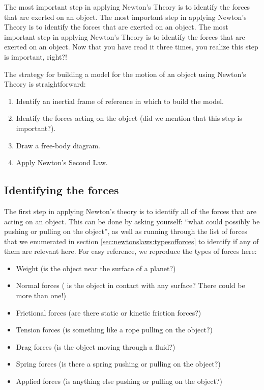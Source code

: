 The most important step in applying Newton's Theory is to identify the forces that are exerted on an object. The most important step in applying Newton's Theory is to identify the forces that are exerted on an object. The most important step in applying Newton's Theory is to identify the forces that are exerted on an object. Now that you have read it three times, you realize this step is important, right?!

The strategy for building a model for the motion of an object using Newton's Theory is straightforward:
\begin{enumerate}
\item Identify an inertial frame of reference in which to build the model.
\item Identify the forces acting on the object (did we mention that this step is important?).
\item Draw a free-body diagram.
\item Apply Newton's Second Law.
\end{enumerate}

\subsection{Identifying the forces}
The first step in applying Newton's theory is to identify all of the forces that are acting on an object. This can be done by asking yourself: ``what could possibly be pushing or pulling on the object'', as well as running through the list of forces that we enumerated in section \ref{sec:newtonslaws:typesofforces} to identify if any of them are relevant here. For easy reference, we reproduce the types of forces here:
\begin{itemize}
\item Weight (is the object near the surface of a planet?)
\item Normal forces ( is the object in contact with any surface? There could be more than one!)
\item Frictional forces (are there static or kinetic friction forces?)
\item Tension forces (is something like a rope pulling on the object?)
\item Drag forces (is the object moving through a fluid?)
\item Spring forces (is there a spring pushing or pulling on the object?)
\item Applied forces (is anything else pushing or pulling on the object?)
\end{itemize}

